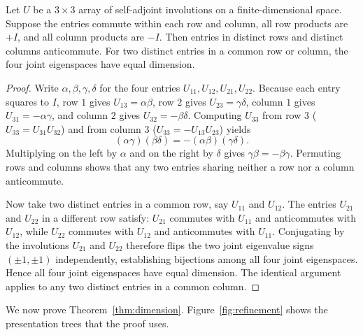 \begin{lemma}\label{lem:square-rank}
Let $U$ be a $3\times3$ array of self-adjoint involutions on a finite-dimensional space. Suppose the entries commute within each row and column, all row products are $+I$, and all column products are $-I$. Then entries in distinct rows and distinct columns anticommute. For two distinct entries in a common row or column, the four joint eigenspaces have equal dimension.
\end{lemma}
\begin{proof}
Write $\alpha,\beta,\gamma,\delta$ for the four entries $U_{11},U_{12},U_{21},U_{22}$. Because each entry squares to $I$, row $1$ gives $U_{13}=\alpha\beta$, row $2$ gives $U_{23}=\gamma\delta$, column $1$ gives $U_{31}=-\alpha\gamma$, and column $2$ gives $U_{32}=-\beta\delta$. Computing $U_{33}$ from row $3$ ($U_{33}=U_{31}U_{32}$) and from column $3$ ($U_{33}=-U_{13}U_{23}$) yields
\[
 (\alpha\gamma)(\beta\delta)=-(\alpha\beta)(\gamma\delta).
\]
Multiplying on the left by $\alpha$ and on the right by $\delta$ gives $\gamma\beta=-\beta\gamma$. Permuting rows and columns shows that any two entries sharing neither a row nor a column anticommute.

Now take two distinct entries in a common row, say $U_{11}$ and $U_{12}$. The entries $U_{21}$ and $U_{22}$ in a different row satisfy: $U_{21}$ commutes with $U_{11}$ and anticommutes with $U_{12}$, while $U_{22}$ commutes with $U_{12}$ and anticommutes with $U_{11}$. Conjugating by the involutions $U_{21}$ and $U_{22}$ therefore flips the two joint eigenvalue signs $(\pm1,\pm1)$ independently, establishing bijections among all four joint eigenspaces. Hence all four joint eigenspaces have equal dimension. The identical argument applies to any two distinct entries in a common column.
\end{proof}

We now prove Theorem~\ref{thm:dimension}. Figure~\ref{fig:refinement} shows the presentation trees that the proof uses.

